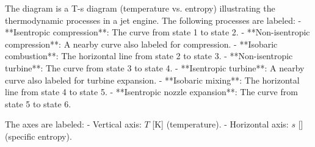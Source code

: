 The diagram is a T-s diagram (temperature vs. entropy) illustrating the thermodynamic processes in a jet engine. The following processes are labeled:  
- **Isentropic compression**: The curve from state 1 to state 2.  
- **Non-isentropic compression**: A nearby curve also labeled for compression.  
- **Isobaric combustion**: The horizontal line from state 2 to state 3.  
- **Non-isentropic turbine**: The curve from state 3 to state 4.  
- **Isentropic turbine**: A nearby curve also labeled for turbine expansion.  
- **Isobaric mixing**: The horizontal line from state 4 to state 5.  
- **Isentropic nozzle expansion**: The curve from state 5 to state 6.  

The axes are labeled:  
- Vertical axis: \( T \) [K] (temperature).  
- Horizontal axis: \( s \) [] (specific entropy).